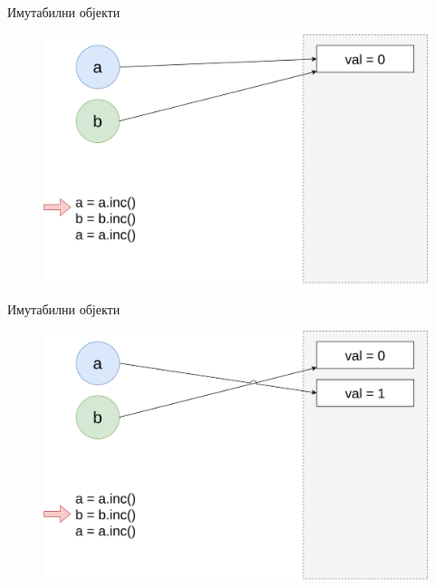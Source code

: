 \documentclass[xcolor=table]{beamer}
\begin{document}
    \begin{frame}{Имутабилни објекти}
        \begin{figure}
            \centering
            \includegraphics[height=0.7\textheight,keepaspectratio]{images/imut0.png}
        \end{figure}
    \end{frame}
    
    \begin{frame}{Имутабилни објекти}
        \begin{figure}
            \centering
            \includegraphics[height=0.7\textheight,keepaspectratio]{images/imut1.png}
        \end{figure}
    \end{frame}
    
\end{document}
